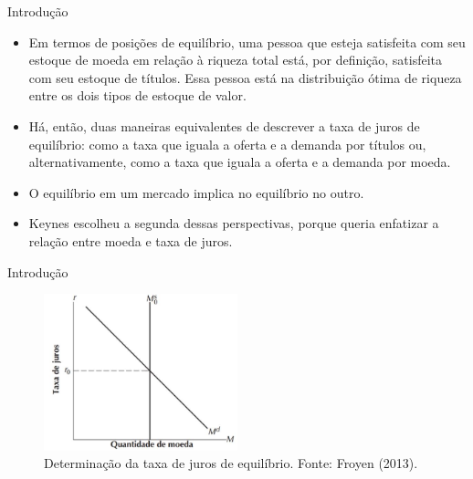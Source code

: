 \documentclass[10pt]{beamer}
\begin{document}
\begin{frame}{Introdução}
\begin{itemize}
    \item Em termos de posições de equilíbrio, uma pessoa que esteja satisfeita com seu estoque de moeda em relação à riqueza total está, por definição, satisfeita com seu estoque de títulos. Essa pessoa está na distribuição ótima de riqueza entre os dois tipos de estoque de valor.
    \bigskip
    \item Há, então, duas maneiras equivalentes de descrever a taxa de juros de equilíbrio: como a taxa que iguala a oferta e a demanda por títulos ou, alternativamente, como a taxa que iguala a oferta e a demanda por moeda.
    \bigskip
    \item O equilíbrio em um mercado implica no equilíbrio no outro.
    \bigskip
    \item Keynes escolheu a segunda dessas perspectivas, porque queria enfatizar a relação entre moeda e taxa de juros.
\end{itemize}
\end{frame}

\begin{frame}{Introdução}
\begin{figure}
    \centering
    \includegraphics[width=0.5\textwidth]{./figures/aula092_fig1.JPG}
    \caption{Determinação da taxa de juros de equilíbrio. Fonte: Froyen (2013).}
    \label{fig1}
\end{figure}
\end{frame}
\end{document}
